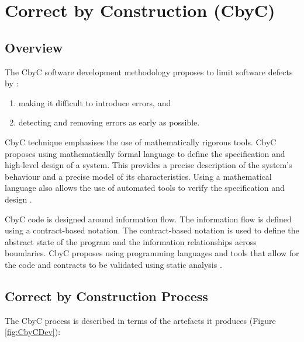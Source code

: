 
\chapter{Correct by Construction (CbyC) } %

\label{Chapter_CbyC} %

\section{Overview}

The CbyC software development methodology proposes to limit software 
defects by \parencite{CbyCMan}:  
\begin{enumerate}
	\item making it difficult to introduce errors, and
	\item detecting and removing errors as early as possible.
\end{enumerate}

CbyC technique emphasises the use of mathematically rigorous tools. CbyC proposes
using mathematically formal language to define the specification and high-level design
of a system. This provides a precise description of the system's behaviour and a
precise model of its characteristics. Using a mathematical language also allows
the use of automated tools to verify the specification and design \parencite{CbyCMan}.

CbyC code is designed around information flow. The information flow is
defined using a contract-based notation. The contract-based notation is
used to define the abstract state of the program and the information relationships
across boundaries. CbyC proposes using programming languages and tools that allow
for the code and contracts to be validated using static analysis \parencite{CbyCMan}.
 

\section{Correct by Construction Process}\label{CbyCDevWorkflow}

The CbyC process is described in terms of the artefacts it produces (Figure \ref{fig:CbyCDev}): 

